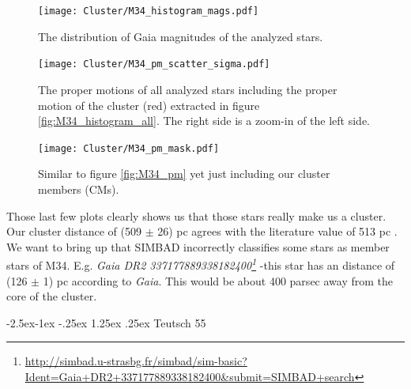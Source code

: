 \documentclass{article}
\makeatletter
\renewcommand\paragraph{\@startsection{paragraph}{4}{\z@}%
            {-2.5ex\@plus -1ex \@minus -.25ex}%
            {1.25ex \@plus .25ex}%
            {\normalfont\normalsize\bfseries}}
\makeatother
\begin{document}
\begin{figure}[H]
  \centering
    \texttt{[image: Cluster/M34\_histogram\_mags.pdf]}
  \caption{The distribution of Gaia magnitudes of the analyzed stars.}
  \label{fig:M34_histogram_mags}
\end{figure}

\begin{figure}[H]
  \centering
    \texttt{[image: Cluster/M34\_pm\_scatter\_sigma.pdf]}
  \caption{The proper motions of all analyzed stars including the proper motion of the cluster (red) extracted in figure \ref{fig:M34_histogram_all}. The right side is a zoom-in of the left side.}
  \label{fig:M34_pm_scatter_sigma}
\end{figure}

\begin{figure}[H]
  \centering
    \texttt{[image: Cluster/M34\_pm\_mask.pdf]}
  \caption{Similar to figure \ref{fig:M34_pm} yet just including our cluster members (CMs).}
  \label{fig:M34_pm_mask}
\end{figure}

Those last few plots clearly shows us that those stars really make us a cluster. Our cluster distance of (509 $\pm$ 26) pc agrees with the literature value of 513 pc \cite{Cantat2018}. We want to bring up that SIMBAD incorrectly classifies some stars as member stars of M34. E.g. \textit{Gaia DR2 337177889338182400\footnote{\url{http://simbad.u-strasbg.fr/simbad/sim-basic?Ident=Gaia+DR2+337177889338182400&submit=SIMBAD+search}}} {-}this star has an distance of (126 $\pm$ 1) pc according to \textit{Gaia}. This would be about 400 parsec away from the core of the cluster. 

\paragraph{Teutsch 55}
\end{document}
